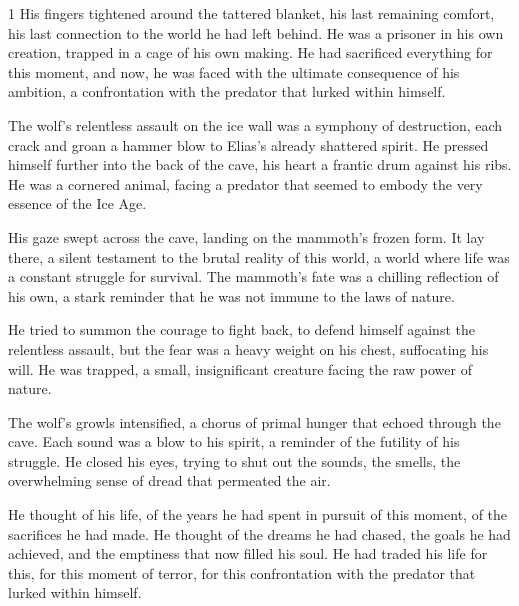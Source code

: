 \documentclass{article}
\newcommand{\Agentsroomzs}{\textsc{Agents' Room$_{ZS}$}}
\begin{document}
\begin{tcolorbox}[colback=white, colframe=gray!30!white, coltitle=black, parskip=5mm, title=
    \textbf{System output: \Agentsroomzs}, breakable]
\begin{spacing}{1}
His fingers tightened around the tattered blanket, his last remaining comfort, his last connection to the world he had left behind.  He was a prisoner in his own creation, trapped in a cage of his own making.  He had sacrificed everything for this moment, and now, he was faced with the ultimate consequence of his ambition, a confrontation with the predator that lurked within himself.\\\par

The wolf's relentless assault on the ice wall was a symphony of destruction, each crack and groan a hammer blow to Elias's already shattered spirit. He pressed himself further into the back of the cave, his heart a frantic drum against his ribs.  He was a cornered animal, facing a predator that seemed to embody the very essence of the Ice Age.\\\par

His gaze swept across the cave, landing on the mammoth's frozen form. It lay there, a silent testament to the brutal reality of this world, a world where life was a constant struggle for survival.  The mammoth's fate was a chilling reflection of his own, a stark reminder that he was not immune to the laws of nature.\\\par

He tried to summon the courage to fight back, to defend himself against the relentless assault, but the fear was a heavy weight on his chest, suffocating his will.  He was trapped, a small, insignificant creature facing the raw power of nature.\\\par

The wolf's growls intensified, a chorus of primal hunger that echoed through the cave. Each sound was a blow to his spirit, a reminder of the futility of his struggle. He closed his eyes, trying to shut out the sounds, the smells, the overwhelming sense of dread that permeated the air.\\\par

He thought of his life, of the years he had spent in pursuit of this moment, of the sacrifices he had made.  He thought of the dreams he had chased, the goals he had achieved, and the emptiness that now filled his soul.  He had traded his life for this, for this moment of terror, for this confrontation with the predator that lurked within himself.\\\par


\end{spacing}
\end{tcolorbox}
\end{document}
